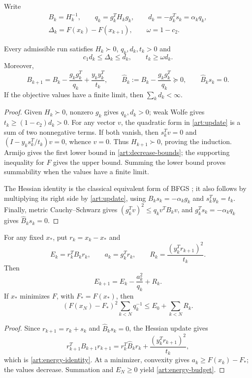 Write
\[
 \begin{gathered}
 B_k=H_k^{-1},\qquad q_k=g_k^TH_kg_k,\qquad
 d_k=-g_k^Ts_k=\alpha_kq_k,\\
 \Delta_k=F(x_k)-F(x_{k+1}),\qquad \omega=1-c_2.
 \end{gathered}
\]
\begin{lemma}\label{art:run-invariants}
Every admissible run satisfies $H_k\succ0$, $q_k,d_k,t_k>0$ and
\begin{equation}\label{art:decrease-bounds}
 c_1d_k\le\Delta_k\le d_k,\qquad t_k\ge\omega d_k.
\end{equation}
Moreover,
\begin{equation}\label{art:hessian-update}
 B_{k+1}=B_k-\frac{g_kg_k^T}{q_k}+\frac{y_ky_k^T}{t_k},
 \qquad \widehat B_k:=B_k-\frac{g_kg_k^T}{q_k}\succeq0,
 \qquad \widehat B_ks_k=0.
\end{equation}
If the objective values have a finite limit, then $\sum_kd_k<\infty$.
\end{lemma}
\begin{proof}
Given $H_k\succ0$, nonzero $g_k$ gives $q_k,d_k>0$; weak Wolfe gives
$t_k\ge(1-c_2)d_k>0$. For any vector $v$, the quadratic form in
\eqref{art:update} is a sum of two nonnegative terms. If both vanish, then
$s_k^Tv=0$ and $(I-y_ks_k^T/t_k)v=0$, whence $v=0$.
Thus $H_{k+1}\succ0$, proving the induction. Armijo gives the first lower
bound in \eqref{art:decrease-bounds}; the supporting inequality for $F$ gives
the upper bound. Summing the lower bound proves summability when the values
have a finite limit.

The Hessian identity is the classical equivalent form of BFGS
\cite[Section~5]{FND_N92}; it also follows by multiplying its right side by
\eqref{art:update}, using $B_ks_k=-\alpha_kg_k$ and $s_k^Ty_k=t_k$.
Finally, metric Cauchy--Schwarz gives
$(g_k^Tv)^2\le q_kv^TB_kv$, and
$g_k^Ts_k=-\alpha_kq_k$ gives $\widehat B_ks_k=0$.
\end{proof}

\begin{lemma}\label{art:reference-energy}
For any fixed $x_*$, put $r_k=x_k-x_*$ and
\[
 E_k=r_k^TB_kr_k,\qquad a_k=g_k^Tr_k,\qquad
 R_k=\frac{(y_k^Tr_{k+1})^2}{t_k}.
\]
Then
\begin{equation}\label{art:energy-identity}
 E_{k+1}=E_k-\frac{a_k^2}{q_k}+R_k.
\end{equation}
If $x_*$ minimizes $F$, with $F_*=F(x_*)$, then
\begin{equation}\label{art:energy-budget}
 (F(x_N)-F_*)^2\sum_{k<N}q_k^{-1}
       \le E_0+\sum_{k<N}R_k.
\end{equation}
\end{lemma}
\begin{proof}
Since $r_{k+1}=r_k+s_k$ and $\widehat B_ks_k=0$, the Hessian update gives
\[
 r_{k+1}^TB_{k+1}r_{k+1}
 =r_k^T\widehat B_kr_k+\frac{(y_k^Tr_{k+1})^2}{t_k},
\]
which is \eqref{art:energy-identity}. At a minimizer, convexity gives
$a_k\ge F(x_k)-F_*$; the values decrease. Summation and $E_N\ge0$ yield
\eqref{art:energy-budget}.
\end{proof}

